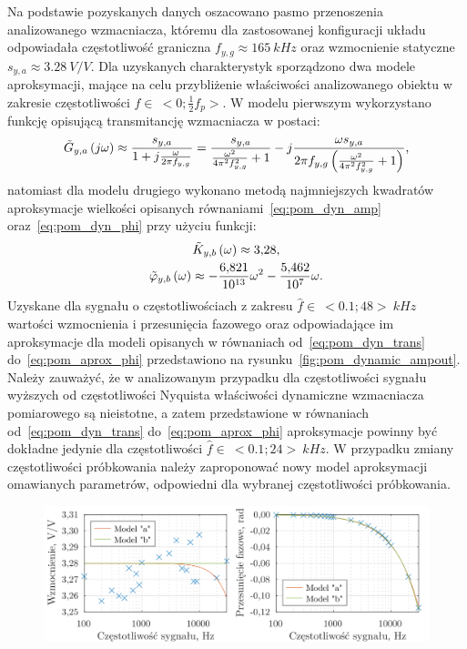 Na podstawie pozyskanych danych oszacowano pasmo przenoszenia analizowanego wzmacniacza, któremu dla zastosowanej konfiguracji układu odpowiadała częstotliwość graniczna $f_{y,g} \approx \qty{165}{kHz}$ oraz wzmocnienie statyczne $s_{y,a} \approx \qty{3.28}{V \per V}$. Dla uzyskanych charakterystyk sporządzono dwa modele aproksymacji, mające na celu przybliżenie właściwości analizowanego obiektu w zakresie częstotliwości $f \in~<0;\frac{1}{2}f_{p}>$. W modelu pierwszym wykorzystano funkcję opisującą transmitancję wzmacniacza w postaci:
\begin{gather}
\tilde{G}_{y,a} \left(j\omega\right) \approx \frac{s_{y,a}}{1 + j \frac{\omega}{2 \pi f_{y,g}}} = \frac{s_{y,a}}{\frac{\omega^{2}}{4 \pi^{2} f_{y,g}^{2}} + 1} - j \frac{\omega s_{y,a}}{2 \pi f_{y,g} \left( \frac{\omega^{2}}{4 \pi^{2} f_{y,g}^{2}} + 1 \right) } \label{eq:pom_dyn_trans},
\end{gather}
natomiast dla modelu drugiego wykonano metodą najmniejszych kwadratów aproksymacje wielkości opisanych równaniami~\eqref{eq:pom_dyn_amp} oraz~\eqref{eq:pom_dyn_phi} przy użyciu funkcji:
\begin{gather}
\tilde{K}_{y,b} \left(\omega\right) \approx \num{3.28} \label{eq:pom_aprox_amp}, \\
\tilde{\varphi}_{y,b} \left(\omega\right) \approx -\frac{\num{6.821}}{\num{e13}} \omega^{2} - \frac{\num{5.462}}{\num{e07}} \omega \label{eq:pom_aprox_phi}.
\end{gather}
Uzyskane dla sygnału o częstotliwościach z zakresu $\hat{f} \in~<\num{0.1};\num{48}>~\unit{kHz}$ wartości wzmocnienia i przesunięcia fazowego oraz odpowiadające im aproksymacje dla modeli opisanych w równaniach od~\eqref{eq:pom_dyn_trans} do~\eqref{eq:pom_aprox_phi} przedstawiono na rysunku~\ref{fig:pom_dynamic_ampout}. Należy zauważyć, że w analizowanym przypadku dla częstotliwości sygnału wyższych od częstotliwości Nyquista właściwości dynamiczne wzmacniacza pomiarowego są nieistotne, a zatem przedstawione w równaniach od~\eqref{eq:pom_dyn_trans} do~\eqref{eq:pom_aprox_phi} aproksymacje powinny być dokładne jedynie dla częstotliwości $\hat{f} \in~<\num{0.1};\num{24}>~\unit{kHz}$. W przypadku zmiany częstotliwości próbkowania należy zaproponować nowy model aproksymacji omawianych parametrów, odpowiedni dla wybranej częstotliwości próbkowania.

\begin{figure}[htb!]
\begin{center}
\includegraphics{obrazki/dynamic_ampout}
\end{center}
\end{figure}

